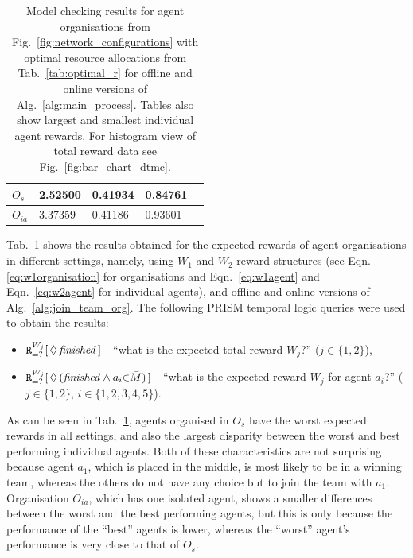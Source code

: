 \documentclass{llncs}
\begin{document}
\begin{table} [h]
{\begin{tabular}{ | l | l | l | l | l |}
    $O_s$  & 2.52500 & 0.41934 & 0.84761  \\ \hline
    $O_{ia}$  & 3.37359 & 0.41186 & 0.93601  \\ \hline
\end{tabular}
}
\caption{Model checking results for agent organisations from Fig.~\ref{fig:network_configurations} with optimal resource allocations from Tab.~\ref{tab:optimal_r} for offline and online versions of Alg.~\ref{alg:main_process}. Tables also show largest and smallest individual agent rewards. For histogram view of total reward data see Fig.~\ref{fig:bar_chart_dtmc}.}
\label{tab:dtmc_results}
\end{table}

Tab.~\ref{tab:dtmc_results} shows the results obtained for the expected rewards of agent organisations in different settings, namely, using $W_1$ and $W_2$ reward structures (see Eqn. \eqref{eq:w1organisation} %
for organisations and Eqn.~\eqref{eq:w1agent} and Eqn.~\eqref{eq:w2agent} for individual agents), and offline and online versions of Alg.~\ref{alg:join_team_org}. The following PRISM temporal logic queries were used to obtain the results:
\begin{itemize}
 \item ${\tt R}_{=?}^{W_{j}}[\,\Diamond\,\mathit{finished}\,]$ -
``what is the expected total reward $W_j$?'' ($j\in\{1,2\}$),
 \item ${\tt R}_{=?}^{W_{j}}[\,\Diamond\,(\mathit{finished} \wedge a_i {\in} \bar{M}) \,]$ -
``what is the expected reward $W_j$ for agent $a_i$?'' ($j\in\{1,2\}$, $i\in\{1,2,3,4,5\}$).
\end{itemize}
As can be seen in Tab.~\ref{tab:dtmc_results}, agents organised in $O_s$ have the worst expected rewards in all settings, and also the largest disparity between the worst and best performing individual agents. Both of these characteristics are not surprising because agent $a_1$, which is placed in the middle, is most likely to be in a winning team, whereas the others do not have any choice but to join the team with $a_1$. Organisation $O_{ia}$, which has one isolated agent, shows a smaller differences between the worst and the best performing agents, but this is only because the performance of the ``best'' agents is lower, whereas the ``worst'' agent's performance is very close to that of $O_s$.
\end{document}
